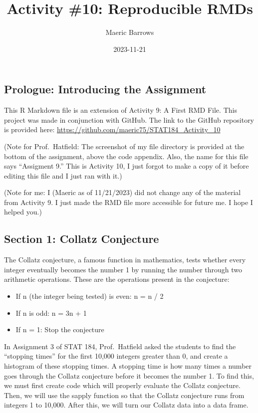 \documentclass[
]{article}
\title{Activity \#10: Reproducible RMDs}
\author{Maeric Barrows}
\date{2023-11-21}
\providecommand{\tightlist}{%
  \setlength{\itemsep}{0pt}\setlength{\parskip}{0pt}}
\begin{document}
\maketitle

\hypertarget{prologue-introducing-the-assignment}{%
\subsection{Prologue: Introducing the
Assignment}\label{prologue-introducing-the-assignment}}

This R Markdown file is an extension of Activity 9: A First RMD File.
This project was made in conjunction with GitHub. The link to the GitHub
repository is provided here:
\url{https://github.com/maeric75/STAT184_Activity_10}

(Note for Prof.~Hatfield: The screenshot of my file directory is
provided at the bottom of the assignment, above the code appendix. Also,
the name for this file says ``Assigment 9.'' This is Activity 10, I just
forgot to make a copy of it before editing this file and I just ran with
it.)

(Note for me: I (Maeric as of 11/21/2023) did not change any of the
material from Activity 9. I just made the RMD file more accessible for
future me. I hope I helped you.)

\hypertarget{section-1-collatz-conjecture}{%
\subsection{Section 1: Collatz
Conjecture}\label{section-1-collatz-conjecture}}

The Collatz conjecture, a famous function in mathematics, tests whether
every integer eventually becomes the number 1 by running the number
through two arithmetic operations. These are the operations present in
the conjecture:

\begin{itemize}
\tightlist
\item
  If n (the integer being tested) is even: n = n / 2
\item
  If n is odd: n = 3n + 1
\item
  If n = 1: Stop the conjecture
\end{itemize}

In Assignment 3 of STAT 184, Prof.~Hatfield asked the students to find
the ``stopping times'' for the first 10,000 integers greater than 0, and
create a histogram of these stopping times. A stopping time is how many
times a number goes through the Collatz conjecture before it becomes the
number 1. To find this, we must first create code which will properly
evaluate the Collatz conjecture. Then, we will use the sapply function
so that the Collatz conjecture runs from integers 1 to 10,000. After
this, we will turn our Collatz data into a data frame.
\end{document}
